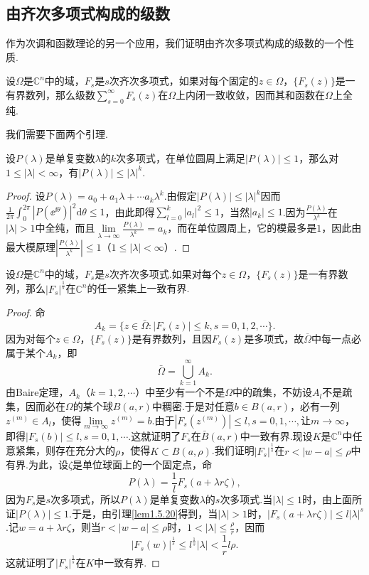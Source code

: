 \subsection{由齐次多项式构成的级数}
作为次调和函数理论的另一个应用，我们证明由齐次多项式构成的级数的一个性质.
\begin{theorem}\label{thm1.5.19}
	设$\Omega$是$\mathbb{C}^n$中的域，$F_s$是$s$次齐次多项式，如果对每个固定的$z\in\Omega$，$\{F_s(z)\}$是一有界数列，那么级数$\sum\limits_{s=0}^\infty F_s(z)$在$\Omega$上内闭一致收敛，因而其和函数在$\Omega$上全纯.
\end{theorem}
我们需要下面两个引理.
\begin{lemma}\label{lem1.5.20}
	设$P(\lambda)$是单复变数$\lambda$的$k$次多项式，在单位圆周上满足$|P(\lambda)|\le1$，那么对$1\le|\lambda|<\infty$，有$|P(\lambda)|\le|\lambda|^k$.
\end{lemma}
\begin{proof}
	设$P(\lambda)=a_0+a_1\lambda+\cdots a_k\lambda^k$.由假定$|P(\lambda)|\le|\lambda|^k$因而$\frac1{2\pi}\int_{0}^{2\pi}|P(\ee^{\ii\theta})|^2\mathrm{d}\theta\le1$，由此即得$\sum\limits_{l=0}^k |a_l|^2\le1$，当然$|a_k|\le1$.因为$\frac{P(\lambda)}{\lambda^k}$在$|\lambda|>1$中全纯，而且$\lim\limits_{\lambda\to\infty}\frac{P(\lambda)}{\lambda^k}=a_k$，而在单位圆周上，它的模最多是$1$，因此由最大模原理$\left|\frac{P(\lambda)}{\lambda^k}\right|\le1$（$1\le|\lambda|<\infty$）.
\end{proof}
\begin{lemma}\label{lem1.5.21}
	设$\Omega$是$\mathbb{C}^n$中的域，$F_s$是$s$次齐次多项式.如果对每个$z\in\Omega$，$\{F_s(z)\}$是一有界数列，那么$|F_s|^{\frac1s}$在$\mathbb{C}^n$的任一紧集上一致有界.
\end{lemma}
\begin{proof}
	命
	\[A_k=\{z\in\bar{\Omega}\colon|F_s(z)|\le k,s=0,1,2,\cdots\}.\]
	因为对每个$z\in\Omega$，$\{F_s(z)\}$是有界数列，且因$F_s(z)$是多项式，故$\overline{\Omega}$中每一点必属于某个$A_k$，即
	\[\bar{\Omega}=\bigcup_{k=1}^\infty A_k.\]
	由Baire定理，$A_k$（$k=1,2,\cdots$）中至少有一个不是$\Omega$中的疏集，不妨设$A_l$不是疏集，因而必在$\Omega$的某个球$B(a,r)$中稠密.于是对任意$b\in B(a,r)$，必有一列$z^{(m)}\in A_l$，使得$\lim\limits_{m\to\infty}z^{(m)}=b$.由于$|F_s(z^{(m)})|\le l,s=0,1,\cdots,$让$m\to\infty$，即得$|F_s(b)|\le l,s=0,1,\cdots$.这就证明了$F_s$在$\bar{B}(a,r)$中一致有界.现设$K$是$\mathbb{C}^n$中任意紧集，则存在充分大的$\rho$，使得$K\subset B(a,\rho)$.我们证明$|F_s|^{\frac1s}$在$r<|w-a|\le\rho$中有界.为此，设$\zeta$是单位球面上的一个固定点，命
	\[P(\lambda)=\frac1l F_s(a+\lambda r\zeta),\]
	因为$F_s$是$s$次多项式，所以$P(\lambda)$是单复变数$\lambda$的$s$次多项式.当$|\lambda|\le1$时，由上面所证$|P(\lambda)|\le1$.于是，由引理\ref{lem1.5.20}得到，当$|\lambda|>1$时，$|F_s(a+\lambda r\zeta)|\le l|\lambda|^s$.记$w=a+\lambda r\zeta$，则当$r<|w-a|\le\rho$时，$1<|\lambda|\le\frac{\rho}{r}$，因而
	\[|F_s(w)|^{\frac1s}\le l^{\frac1s}|\lambda|<\frac1r l\rho.\]
	这就证明了$|F_s|^{\frac1s}$在$K$中一致有界.
\end{proof}
